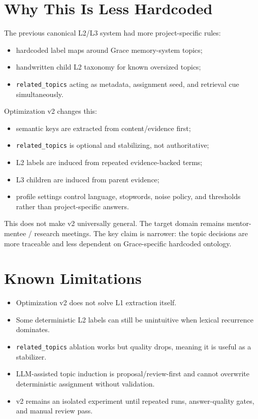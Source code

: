 \documentclass[11pt,a4paper]{article}
\newcommand{\code}[1]{{\footnotesize\texttt{#1}}}
\begin{document}
\section{Why This Is Less Hardcoded}

The previous canonical L2/L3 system had more project-specific rules:

\begin{itemize}
  \item hardcoded label maps around Grace memory-system topics;
  \item handwritten child L2 taxonomy for known oversized topics;
  \item \code{related\_topics} acting as metadata, assignment seed, and retrieval cue simultaneously.
\end{itemize}

Optimization v2 changes this:

\begin{itemize}
  \item semantic keys are extracted from content/evidence first;
  \item \code{related\_topics} is optional and stabilizing, not authoritative;
  \item L2 labels are induced from repeated evidence-backed terms;
  \item L3 children are induced from parent evidence;
  \item profile settings control language, stopwords, noise policy, and thresholds rather than project-specific answers.
\end{itemize}

This does not make v2 universally general. The target domain remains mentor-mentee / research meetings. The key claim is narrower: the topic decisions are more traceable and less dependent on Grace-specific hardcoded ontology.

\section{Known Limitations}

\begin{itemize}
  \item Optimization v2 does not solve L1 extraction itself.
  \item Some deterministic L2 labels can still be unintuitive when lexical recurrence dominates.
  \item \code{related\_topics} ablation works but quality drops, meaning it is useful as a stabilizer.
  \item LLM-assisted topic induction is proposal/review-first and cannot overwrite deterministic assignment without validation.
  \item v2 remains an isolated experiment until repeated runs, answer-quality gates, and manual review pass.
\end{itemize}
\end{document}
